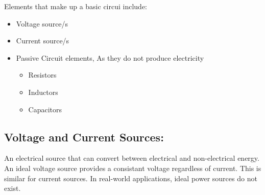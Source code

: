 \documentclass[a5paper]{article}
\begin{document}
	Elements that make up a basic circui include:
	\begin{itemize}
		\item Voltage source/s
		\item Current source/s
		\item Passive Circuit elements, As they do not produce electricity
			\begin{itemize}
				\item Resistors
				\item Inductors
				\item Capacitors
			\end{itemize}
	\end{itemize}
	\subsection{Voltage and Current Sources:}
	An electrical source that can convert between electrical and non-electrical energy. An ideal voltage source provides a consistant voltage regardless of current. This is similar for current sources. In real-world applications, ideal power sources do not exist.
\end{document}

